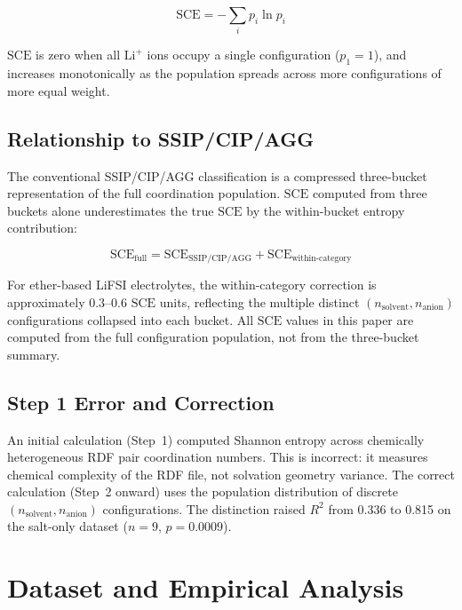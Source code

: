 \documentclass[12pt,letterpaper]{article}
\newcommand{\mSCE}{\mathrm{SCE}}
\begin{document}
\begin{equation}
  \mSCE = -\sum_{i} p_{i} \ln p_{i}
  \label{eq:sce}
\end{equation}

$\mSCE$ is zero when all $\mathrm{Li}^{+}$ ions occupy
a single configuration ($p_{1} = 1$), and increases
monotonically as the population spreads across more
configurations of more equal weight.

\subsection{Relationship to SSIP/CIP/AGG}
\label{sec:ssip}

The conventional SSIP/CIP/AGG classification is a
compressed three-bucket representation of the full
coordination population.
$\mSCE$ computed from three buckets alone underestimates
the true $\mSCE$ by the within-bucket entropy
contribution:

\begin{equation}
  \mSCE_{\mathrm{full}} =
  \mSCE_{\mathrm{SSIP/CIP/AGG}}
  + \mSCE_{\mathrm{within\text{-}category}}
  \label{eq:correction}
\end{equation}

For ether-based LiFSI electrolytes, the within-category
correction is approximately 0.3--0.6 $\mSCE$ units,
reflecting the multiple distinct
$(n_{\mathrm{solvent}}, n_{\mathrm{anion}})$
configurations collapsed into each bucket.
All $\mSCE$ values in this paper are computed from the
full configuration population, not from the three-bucket
summary.

\subsection{Step 1 Error and Correction}
\label{sec:step1}

An initial calculation (Step~1) computed Shannon entropy
across chemically heterogeneous RDF pair coordination
numbers.
This is incorrect: it measures chemical complexity of the
RDF file, not solvation geometry variance.
The correct calculation (Step~2 onward) uses the
population distribution of discrete
$(n_{\mathrm{solvent}}, n_{\mathrm{anion}})$
configurations.
The distinction raised $R^{2}$ from 0.336 to 0.815 on
the salt-only dataset ($n = 9$, $p = 0.0009$).

\section{Dataset and Empirical Analysis}
\label{sec:dataset}
\end{document}
